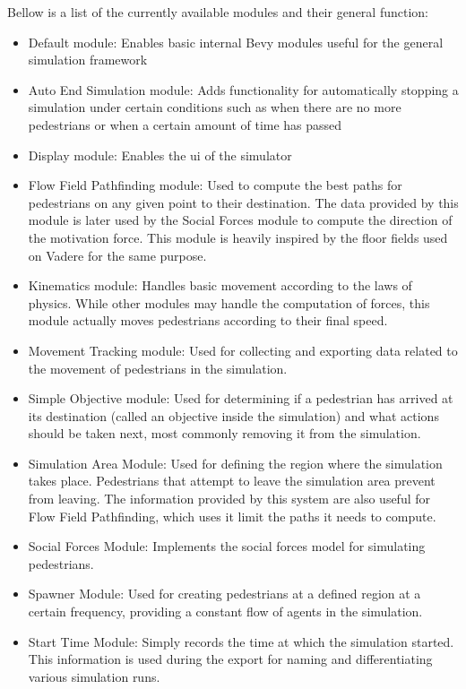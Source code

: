 \documentclass[twoside, 11pt]{article}
\begin{document}
Bellow is a list of the currently available modules and their general function:

\begin{itemize}
  \item Default module: Enables basic internal Bevy modules useful for the general simulation framework
  \item Auto End Simulation module: Adds functionality for automatically stopping a simulation under certain conditions such as when there are no more pedestrians or when a certain amount of time has passed
  \item Display module: Enables the \gls{ui} of the simulator
  \item Flow Field Pathfinding module: Used to compute the best paths for pedestrians on any given point to their destination. The data provided by this module is later used by the Social Forces module to compute the direction of the motivation force. This module is heavily inspired by the floor fields used on Vadere for the same purpose.
  \item Kinematics module: Handles basic movement according to the laws of physics. While other modules may handle the computation of forces, this module actually moves pedestrians according to their final speed.
  \item Movement Tracking module: Used for collecting and exporting data related to the movement of pedestrians in the simulation.
  \item Simple Objective module: Used for determining if a pedestrian has arrived at its destination (called an objective inside the simulation) and what actions should be taken next, most commonly removing it from the simulation.
  \item Simulation Area Module: Used for defining the region where the simulation takes place. Pedestrians that attempt to leave the simulation area prevent from leaving. The information provided by this system are also useful for Flow Field Pathfinding, which uses it limit the paths it needs to compute.
  \item Social Forces Module: Implements the social forces model for simulating pedestrians.
  \item Spawner Module: Used for creating pedestrians at a defined region at a certain frequency, providing a constant flow of agents in the simulation.
  \item Start Time Module: Simply records the time at which the simulation started. This information is used during the export for naming and differentiating various simulation runs.
\end{itemize}
\end{document}
